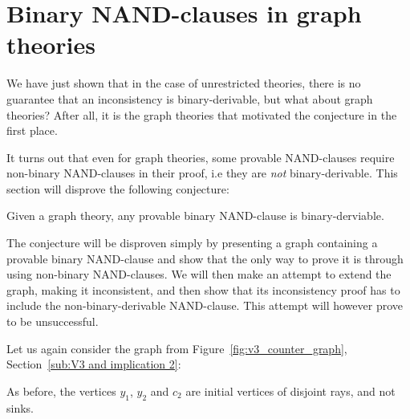 \section{Binary NAND-clauses in graph theories}
\label{sec:Binary NAND-clauses in graph theories}
We have just shown that in the case of unrestricted theories, there is no guarantee that an inconsistency is binary-derivable, but what about graph theories?
After all, it is the graph theories that motivated the conjecture in the first place.

It turns out that even for graph theories, some provable NAND-clauses require non-binary NAND-clauses in their proof, i.e they are \textit{not} binary-derivable.
This section will disprove the following conjecture:
\begin{conjecture}
  Given a graph theory, any provable binary NAND-clause is binary-derviable.
  \label{thm:non_binary_derivable}
\end{conjecture}
The conjecture will be disproven simply by presenting a graph containing a provable binary NAND-clause and show that the only way to prove it is through using non-binary NAND-clauses.
We will then make an attempt to extend the graph, making it inconsistent, and then show that its inconsistency proof has to include the non-binary-derivable NAND-clause.
This attempt will however prove to be unsuccessful.

Let us again consider the graph from Figure~\ref{fig:v3_counter_graph}, Section~\ref{sub:V3 and implication 2}:\par
\begin{figure}[!h]
  \centering
  \caption{}
  \label{fig:open_door}
\end{figure}
As before, the vertices $y_1$, $y_2$ and $c_2$ are initial vertices of disjoint rays, and not sinks.

